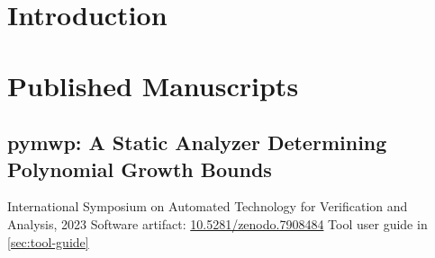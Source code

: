 \documentclass[letterpaper,11pt,draft]{report}
\title{\EDSTITLE}
\author{\EDSAUTHOR}
\date{\today}
\newcounter{insertpages}
\begin{document}
\maketitle\clearpage
\clearpage
\clearpage
\tableofcontents\clearpage
\listoftables\clearpage
\listoffigures\clearpage

\setcounter{chapter}{0}
\chapter{Introduction}\label{ch:introduction}


\chapter{Published Manuscripts}\label{ch:published-manuscripts}\clearpage

\section*{pymwp: A Static Analyzer Determining Polynomial Growth Bounds}
\label{sec:atva}
{International Symposium on Automated Technology for Verification and Analysis, 2023}
{\noindent Software artifact: \href{https://doi.org/10.5281/zenodo.7908484}{10.5281/zenodo.7908484}
\newline\noindent Tool user guide in \autoref{sec:tool-guide}}


\setcounter{insertpages}{0}

\end{document}
